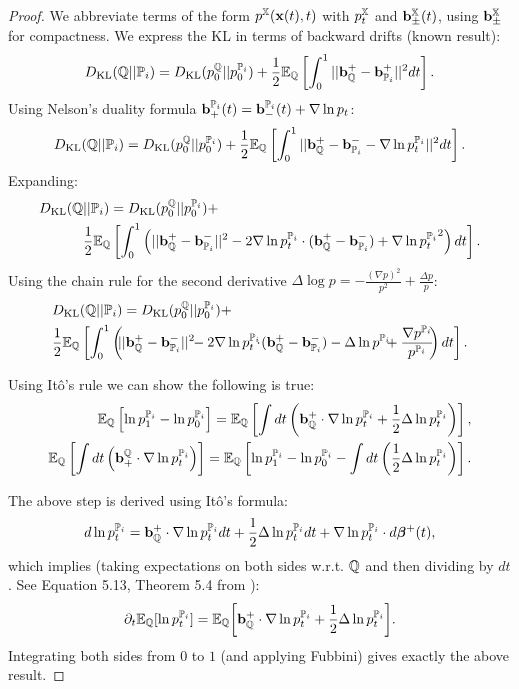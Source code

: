 \documentclass[a4paper,12pt,twoside,openright]{report}
\theoremstyle{definition}
\begin{document}
\begin{proof}
We  abbreviate  terms of the form $p^{{\mathbb{X}}}({\mathbf{x}}(t), t)$ with $p^{{\mathbb{X}}}_t$ and ${\mathbf{b}}^{{\mathbb{X}}}_{\pm}(t)$, using ${\mathbf{b}}^{{\mathbb{X}}}_{\pm}$ for compactness. We express the KL in terms of backward drifts (known result):
\begin{align}
D_{\mathrm{KL}}({\mathbb{Q}}||{{\mathbb{P}}_{i}}) = D_{\mathrm{KL}}( p_0^{{\mathbb{Q}}}|| p_0^{{{\mathbb{P}}_{i}}}) + \frac{1}{2}\mathbb{E}_{{\mathbb{Q}}}\left[\int_0^1 || {\mathbf{b}}_{\mathbb{Q}}^{+} -{\mathbf{b}}_{{\mathbb{P}}_{i}}^{+}||^2 dt\right].
\end{align}
Using Nelson's duality formula ${\mathbf{b}}^{{\mathbb{P}}_{i}}_+(t) ={\mathbf{b}}^{{\mathbb{P}}_{i}}_-(t) + \nabla\operatorname{ln} p_t$:
\begin{align}
D_{\mathrm{KL}}({\mathbb{Q}}||{{\mathbb{P}}_{i}}) = D_{\mathrm{KL}}( p_0^{{\mathbb{Q}}}|| p_0^{{{\mathbb{P}}_{i}}}) + \frac{1}{2}\mathbb{E}_{{\mathbb{Q}}}\left[\int_0^1 || {\mathbf{b}}_{\mathbb{Q}}^{+} - {\mathbf{b}}_{{\mathbb{P}}_{i}}^{-} - \nabla\operatorname{ln} p_t^{{\mathbb{P}}_{i}}||^2 dt\right].
\end{align}
Expanding:
\begin{align*}
D_{\mathrm{KL}}({\mathbb{Q}}&||{{\mathbb{P}}_{i}}) = D_{\mathrm{KL}}( p_0^{{\mathbb{Q}}}|| p_0^{{{\mathbb{P}}_{i}}}) +\\ &\frac{1}{2}\mathbb{E}_{{\mathbb{Q}}}\left[\int_0^1 \left(|| {\mathbf{b}}_{\mathbb{Q}}^{+} - {\mathbf{b}}_{{\mathbb{P}}_{i}}^{-}||^2 - 2\nabla\operatorname{ln} p_t^{{\mathbb{P}}_{i}} \cdot ( {\mathbf{b}}_{\mathbb{Q}}^{+} - {\mathbf{b}}_{{\mathbb{P}}_{i}}^{-}) + {\nabla\operatorname{ln} p_t^{{\mathbb{P}}_{i}}}^2 \right)dt\right].
\end{align*}
Using the chain rule for the second derivative $\Delta \log  p = -\frac{(\nabla p)^2}{ p^2}  + \frac{\Delta  p}{ p}$:
\begin{align*}
&\KL(\Q||{\P_{i}}) =\KL( p_0^{\Q}|| p_0^{{\P_{i}}}) +\\ &\frac{1}{2}\E_{\Q}\left[\int_0^1 \left(\!\!|| \rvb_\Q^{+} - \rvb_{\P_{i}}^{-}||^2 \!\!- 2\nabla\log p_t^{\P_{i}}\!\!\!\cdot \!( \rvb_\Q^{+} - \rvb_{\P_{i}}^{-}) - \Delta \log  p^{\P_{i}}\!\!\!+ \frac{\nabla  p^{\P_{i}}}{ p^{\P_{i}}}\!\!\right)dt\right].
\end{align*}

Using Itô's rule we can show the following is true: 
\begin{align*}
\mathbb{E}_{\mathbb{Q}}\left[\operatorname{ln} p^{{\mathbb{P}}_{i}}_1-\operatorname{ln} p^{{\mathbb{P}}_{i}}_0\right] = \mathbb{E}_{\mathbb{Q}}\left[\int dt \left({\mathbf{b}}^+_{\mathbb{Q}}\cdot\nabla\operatorname{ln} p_t^{{\mathbb{P}}_{i}} + \frac{1}{2}\Delta \operatorname{ln} p_t^{{\mathbb{P}}_{i}}\right)\right],\\
\mathbb{E}_{\mathbb{Q}}\left[\int dt \left({\mathbf{b}}_+^{\mathbb{Q}}\cdot\nabla\operatorname{ln} p_t^{{\mathbb{P}}_{i}} \right)\right] = \mathbb{E}_{\mathbb{Q}}\left[\operatorname{ln} p^{{\mathbb{P}}_{i}}_1-\operatorname{ln} p^{{\mathbb{P}}_{i}}_0 - \int dt \left( \frac{1}{2}\Delta \operatorname{ln} p_t^{{\mathbb{P}}_{i}}\right)\right].
\end{align*}

The above step is derived using Itô's formula:
\begin{align*}
d\operatorname{ln}  p_t^{{{\mathbb{P}}_{i}}} ={\mathbf{b}}^+_{\mathbb{Q}}\cdot\nabla\operatorname{ln} p_t^{{\mathbb{P}}_{i}} dt + \frac{1}{2}\Delta \operatorname{ln} p_t^{{\mathbb{P}}_{i}} dt + \nabla \operatorname{ln} p_t^{{\mathbb{P}}_{i}} \cdot d{\bm{\beta}}^{+}(t),
\end{align*}
which implies (taking expectations on both sides w.r.t. ${\mathbb{Q}}$ and then dividing by $dt$. See Equation 5.13, Theorem 5.4 from \cite{sarkka2019applied}):
\begin{align*}
\partial_t \mathbb{E}_{{\mathbb{Q}}}[\operatorname{ln}  p_t^{{{\mathbb{P}}_{i}}}] = \mathbb{E}_{{\mathbb{Q}}}{\left[{\mathbf{b}}^+_{\mathbb{Q}}\cdot\nabla\operatorname{ln} p_t^{{\mathbb{P}}_{i}} + \frac{1}{2}\Delta \operatorname{ln} p_t^{{\mathbb{P}}_{i}}\right]}.
\end{align*}
Integrating both sides from $0$ to $1$ (and applying Fubbini) gives exactly the above result.


\end{proof}
\end{document}
